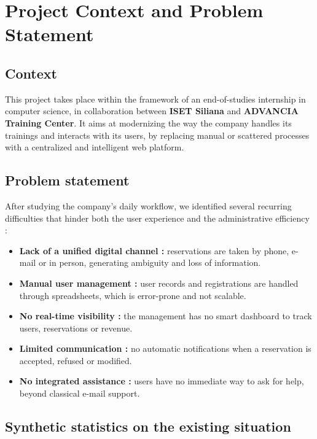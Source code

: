 \section{Project Context and Problem Statement}

\subsection{Context}

This project takes place within the framework of an end-of-studies internship in computer science, in collaboration between \textbf{ISET Siliana} and \textbf{ADVANCIA Training Center}. It aims at modernizing the way the company handles its trainings and interacts with its users, by replacing manual or scattered processes with a centralized and intelligent web platform.

\subsection{Problem statement}

After studying the company's daily workflow, we identified several recurring difficulties that hinder both the user experience and the administrative efficiency :

\begin{itemize}[leftmargin=2em,itemsep=0.3em]
  \item \textbf{Lack of a unified digital channel :} reservations are taken by phone, e-mail or in person, generating ambiguity and loss of information.
  \item \textbf{Manual user management :} user records and registrations are handled through spreadsheets, which is error-prone and not scalable.
  \item \textbf{No real-time visibility :} the management has no smart dashboard to track users, reservations or revenue.
  \item \textbf{Limited communication :} no automatic notifications when a reservation is accepted, refused or modified.
  \item \textbf{No integrated assistance :} users have no immediate way to ask for help, beyond classical e-mail support.
\end{itemize}

\subsection{Synthetic statistics on the existing situation}

